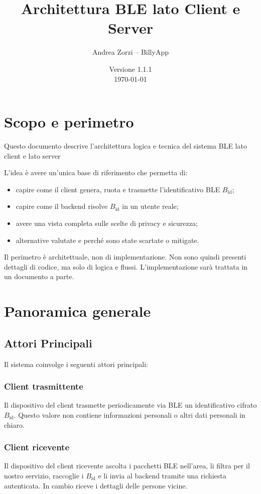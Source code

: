 \documentclass[a4paper,11pt]{article}
\title{Architettura BLE lato Client e Server}
\author{Andrea Zorzi -- BillyApp}
\date{Versione 1.1.1 \\ \today}
\begin{document}
\maketitle

\tableofcontents

\newpage

\section{Scopo e perimetro}

Questo documento descrive l’architettura logica e tecnica del sistema BLE lato client e lato server

L'idea è avere un'unica base di riferimento che permetta di:
\begin{itemize}
  \item capire come il client genera, ruota e trasmette l'identificativo BLE \(B_{\text{id}}\);
  \item capire come il backend risolve \(B_{\text{id}}\) in un utente reale;
  \item avere una vista completa sulle scelte di privacy e sicurezza;
  \item alternative valutate e perché sono state scartate o mitigate.
\end{itemize}

Il perimetro è architettuale, non di implementazione. Non sono quindi presenti dettagli di codice, ma solo di logica e flussi.
L'implementazione sarà trattata in un documento a parte.

\section{Panoramica generale}
\subsection{Attori Principali}
Il sistema coinvolge i seguenti attori principali:
\subsubsection{Client trasmittente}
Il dispositivo del client trasmette periodicamente via BLE un identificativo cifrato \(B_{\text{id}}\).
Questo valore non contiene informazioni personali o altri dati personali in chiaro.

\subsubsection{Client ricevente}
Il dispositivo del client ricevente ascolta i pacchetti BLE nell'area, li filtra per il nostro servizio, raccoglie i \(B_{\text{id}}\) e li invia al backend tramite
una richiesta autenticata. In cambio riceve i dettagli delle persone vicine.
\end{document}

